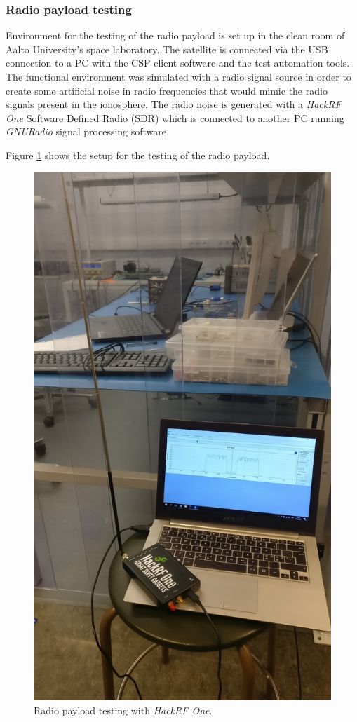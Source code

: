 \documentclass[english,12pt,a4paper,pdftex,elec,utf8]{aaltothesis}
\begin{document}
\subsubsection{Radio payload testing}
Environment for the testing of the radio payload is set up in the clean room of Aalto University's space laboratory. The satellite is connected via the USB connection to a PC with the CSP client software and the test automation tools. The functional environment was simulated with a radio signal source in order to create some artificial noise in radio frequencies that would mimic the radio signals present in the ionosphere. The radio noise is generated with a \textit{HackRF One} Software Defined Radio (SDR) which is connected to another PC running \textit{GNURadio} signal processing software.\par 
Figure \ref{s100hackrf} shows the setup for the testing of the radio payload.\par   
\begin{figure}[h!]
\centering
\includegraphics[scale=0.3]{payload_testing_hackrf}
\caption{Radio payload testing with \textit{HackRF One}.}
\label{s100hackrf}
\end{figure}
\end{document}
